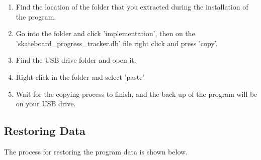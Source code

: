 \begin{enumerate}
\item Find the location of the folder that you extracted during the installation of the program.
\item Go into the folder and click 'implementation', then on the 'skateboard\_progress\_tracker.db' file right click and press 'copy'.
\item Find the USB drive folder and open it.
\item Right click in the folder and select 'paste' 
\item Wait for the copying process to finish, and the back up of the program will be on your USB drive.
\end{enumerate}

\subsection{Restoring Data}

The process for restoring the program data is shown below.

